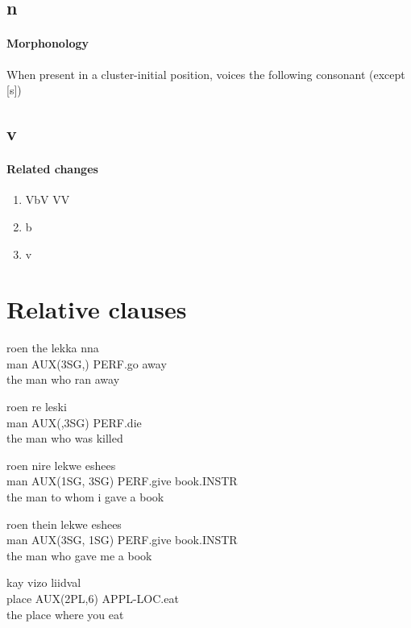 \documentclass[8pt]{book}
\begin{document}
\subsection{n}
\paragraph{Morphonology} When present in a cluster-initial position, voices the following consonant (except [s])

\subsection{v}
\paragraph{Related changes}
\begin{enumerate}
\item VbV \textrightarrow VV
\item b \textrightarrow {}
\item {} \textrightarrow v
\end{enumerate}



\section{Relative clauses}

\begin{exe}
\ex
\gll roen the lekka nna \\
 man AUX(3SG,) PERF.go away \\
\trans the man who ran away

\ex
\gll roen re leski \\
man AUX(,3SG) PERF.die \\
\trans the man who was killed


\ex
\gll roen nire lekwe eshees \\
man AUX(1SG, 3SG) PERF.give book.INSTR \\
\trans the man to whom i gave a book

\ex
\gll roen thein lekwe eshees \\
man AUX(3SG, 1SG) PERF.give book.INSTR \\
\trans the man who gave me a book

\ex
\gll kay vizo liidval \\
place AUX(2PL,6) APPL-LOC.eat \\
\trans the place where you eat
\end{exe}
\end{document}
